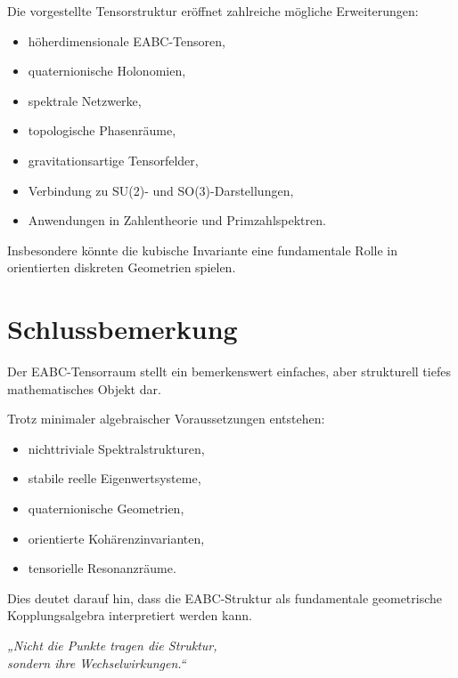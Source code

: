 \documentclass[11pt,a4paper]{article}
\theoremstyle{definition}
\begin{document}
	Die vorgestellte Tensorstruktur eröffnet zahlreiche mögliche Erweiterungen:
	
	\begin{itemize}
		\item höherdimensionale EABC-Tensoren,
		\item quaternionische Holonomien,
		\item spektrale Netzwerke,
		\item topologische Phasenräume,
		\item gravitationsartige Tensorfelder,
		\item Verbindung zu SU(2)- und SO(3)-Darstellungen,
		\item Anwendungen in Zahlentheorie und Primzahlspektren.
	\end{itemize}
	
	Insbesondere könnte die kubische Invariante eine fundamentale Rolle in orientierten diskreten Geometrien spielen.
	
	\section{Schlussbemerkung}
	
	Der EABC-Tensorraum stellt ein bemerkenswert einfaches, aber strukturell tiefes mathematisches Objekt dar.
	
	Trotz minimaler algebraischer Voraussetzungen entstehen:
	
	\begin{itemize}
		\item nichttriviale Spektralstrukturen,
		\item stabile reelle Eigenwertsysteme,
		\item quaternionische Geometrien,
		\item orientierte Kohärenzinvarianten,
		\item tensorielle Resonanzräume.
	\end{itemize}
	
	Dies deutet darauf hin, dass die EABC-Struktur als fundamentale geometrische Kopplungsalgebra interpretiert werden kann.
	
	\vspace{1cm}
	
	\begin{center}
		\textit{„Nicht die Punkte tragen die Struktur,\\
			sondern ihre Wechselwirkungen.“}
	\end{center}
	
\end{document}
